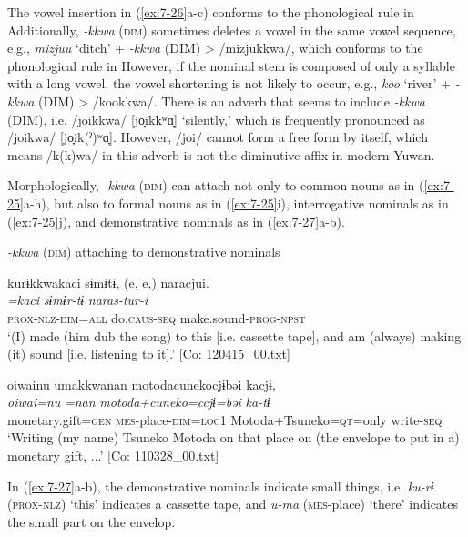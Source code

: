 The vowel insertion in (\ref{ex:7-26}a-c) conforms to the phonological rule in  Additionally, \textit{{}-kkwa} (\textsc{dim}) sometimes deletes a vowel in the same vowel sequence, e.g., \textit{mizjuu} ‘ditch’ + \textit{{}-kkwa} (DIM) > /mizjukkwa/, which conforms to the phonological rule in  However, if the nominal stem is composed of only a syllable with a long vowel, the vowel shortening is not likely to occur, e.g., \textit{koo} ‘river’ + \textit{{}-kkwa} (DIM) > /kookkwa/. There is an adverb that seems to include \textit{{}-kkwa} (DIM), i.e. /joikkwa/ [jo̞ikkʷɑ̞] ‘silently,’ which is frequently pronounced as /joikwa/ [jo̞ik(ˀ)ʷɑ̞]. However, /joi/ cannot form a free form by itself, which means /k(k)wa/ in this adverb is not the diminutive affix in modern Yuwan.

  Morphologically, \textit{{}-kkwa} (\textsc{dim}) can attach not only to common nouns as in (\ref{ex:7-25}a-h), but also to formal nouns as in (\ref{ex:7-25}i), interrogative nominals as in (\ref{ex:7-25}j), and demonstrative nominals as in (\ref{ex:7-27}a-b).

\ea \label{ex:7:27}  \textit{{}-kkwa} (\textsc{dim}) attaching to demonstrative nominals

\ea \label{ex:7:a}{\TM}
\glll  kurɨkkwakaci  sɨmɨtɨ,  (e, e,)  naracjui.\\
\textit{=kaci}  \textit{sɨmɨr-tɨ}    \textit{naras-tur-i}\\
\textsc{prox}-\textsc{nlz}-\textsc{dim}=\textsc{all}  do.\textsc{caus}-\textsc{seq}    make.sound-\textsc{prog}-\textsc{npst}\\
\glt ‘(I) made (him dub the song) to this [i.e. cassette tape], and am (always) making (it) sound [i.e. listening to it].’ [Co: 120415\_00.txt]

\ex \label{ex:7:b}{\TM}
\glll  {\textbar}oiwai{\textbar}nu  umakkwanan  motodacunekocjɨbəi kacjɨ,    \\
\textit{oiwai=nu}  \textit{=nan}  \textit{motoda+cuneko=ccjɨ=bəi}  \textit{ka-tɨ}\\
monetary.gift=\textsc{gen}  \textsc{mes}-place-\textsc{dim}=\textsc{loc}1  Motoda+Tsuneko=\textsc{qt}=only       write-\textsc{seq}    \\
\glt ‘Writing (my name) Tsuneko Motoda on that place on (the envelope to put in a) monetary gift, ...’ [Co: 110328\_00.txt]

\z
\z

In (\ref{ex:7-27}a-b), the demonstrative nominals indicate small things, i.e. \textit{ku-rɨ} (\textsc{prox}-\textsc{nlz}) ‘this’ indicates a cassette tape, and \textit{u-ma} (\textsc{mes}-place) ‘there’ indicates the small part on the envelop.

